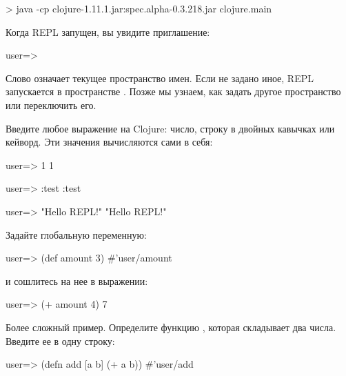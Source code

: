 \begin{english}
  \begin{bash}
> java -cp clojure-1.11.1.jar:spec.alpha-0.3.218.jar clojure.main
  \end{bash}
\end{english}

Когда REPL запущен, вы увидите приглашение:

\begin{english}
  \begin{text}
user=>
  \end{text}
\end{english}

Слово  означает текущее пространство имен. Если не задано иное, REPL запускается в пространстве . Позже мы узнаем, как задать другое пространство или переключить его.

Введите любое выражение на Clojure: число, строку в двойных кавычках или кейворд. Эти значения вычисляются сами в себя:

\begin{english}
  \begin{clojure}
user=> 1
1

user=> :test
:test

user=> "Hello REPL!"
"Hello REPL!"
  \end{clojure}
\end{english}

Задайте глобальную переменную:

\begin{english}
  \begin{clojure}
user=> (def amount 3)
#'user/amount
  \end{clojure}
\end{english}

и сошлитесь на нее в выражении:

\begin{english}
  \begin{clojure}
user=> (+ amount 4)
7
  \end{clojure}
\end{english}

Более сложный пример. Определите функцию , которая складывает два числа. Введите ее в одну строку:

\begin{english}
  \begin{clojure}
user=> (defn add [a b] (+ a b))
#'user/add
  \end{clojure}
\end{english}

